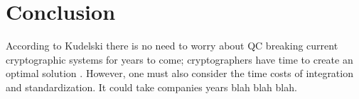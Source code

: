 \section{Conclusion}
According to Kudelski there is no need to worry about QC breaking current cryptographic systems for years to come; cryptographers have time to create an optimal solution \cite{Impact_QC_Cryptog}. However, one must also consider the time costs of integration and standardization. It could take companies years blah blah blah.